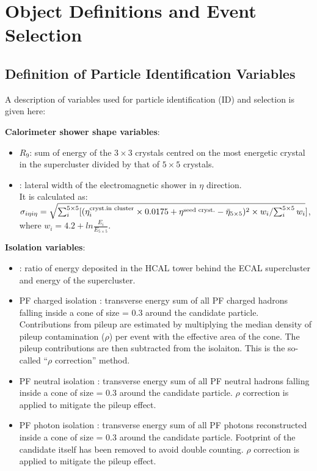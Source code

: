 \documentclass[thesis.tex]{subfiles}
\renewcommand\_{\textunderscore\allowbreak}
\begin{document}
\chapter{Object Definitions and Event Selection}
\label{sec:eventSelection}

\section{Definition of Particle Identification Variables}
A description of variables used for particle identification (ID) and selection is given here:

\noindent \textbf{Calorimeter shower shape variables}:
\begin{itemize}
	\item $R_9$: sum of energy of the $3\times3$ crystals centred on the most energetic crystal in the supercluster divided by that of $5\times5$ crystals. 
	\item \Sigmaieie: lateral width of the electromagnetic shower in $\eta$ direction. \\
		It is calculated as: $\sigma_{i\eta i\eta} = \sqrt{\sum_i^{5\times5}[(\eta_i^{\text{cryst.in cluster}}\times 0.0175 + \eta^{\text{seed cryst.}} - \bar{\eta}_{5\times5})^2 \times w_i/{\sum_i^{5\times5}w_i}}]$, where $w_i = 4.2+ln\frac{E_i}{E_{5\times5}}$.
\end{itemize}
\noindent \textbf{Isolation variables}:
\begin{itemize}
	\item \HoverE: ratio of energy deposited in the HCAL tower behind the ECAL supercluster and energy of the supercluster.
	\item PF charged isolation \ChIso: transverse energy sum of all PF charged hadrons falling inside a cone of size \DeltaR = 0.3 around the candidate particle. Contributions from pileup are estimated by multiplying the median density of pileup contamination ($\rho$) per event with the effective area of the cone. The pileup contributions are then subtracted from the isolaiton. This is the so-called ``$\rho$ correction'' method. 
	\item PF neutral isolation \NeuIso:  transverse energy sum of all PF neutral hadrons falling inside a cone of size \DeltaR = 0.3 around the candidate particle. $\rho$ correction is applied to mitigate the pileup effect. 
	\item PF photon isolation \PhoIso: transverse energy sum of all PF photons reconstructed inside a cone of size \DeltaR = 0.3 around the candidate particle. Footprint of the candidate itself has been removed to avoid double counting. $\rho$ correction is applied to mitigate the pileup effect.
\end{itemize}
\end{document}
